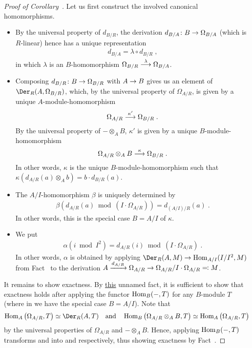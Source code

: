 \documentclass[a4paper,parskip=half,numbers=enddot, DIV=12, headheight=30pt]{scrreprt}
\begin{document}
\begin{proof}[Proof of Corollary~]
	Let us first construct the involved canonical homomorphisms.
	\begin{itemize}
		\item 
		By the universal property of $d_{B/R}$, the derivation $d_{B/A}\colon B\morphism \Omega_{B/A}$ (which is $R$-linear) hence has a unique representation 
		\begin{align*}
			d_{B/A} = \lambda \circ d_{B/R}\;,
		\end{align*}
		in which $\lambda$ is an $B$-homomorphism $\Omega_{B/R}\morphism[\lambda]\Omega_{B/A}$.
		 \item 
		 Composing $d_{B/R}\colon B \morphism \Omega_{B/R}$ with $A\morphism B$ gives us an element of $\Der_R(A, \Omega_{B/R})$, which, by the universal property of $\Omega_{A/R}$, is given by a unique $A$-module-homomorphism 
		 \begin{align*}
		 	\Omega_{A/R} \morphism[\kappa'] \Omega_{B/R}\;.
		 \end{align*}
		 By the universal property of $-\otimes_A B$, $\kappa'$ is given by a unique $B$-module-homomorphism
		 \begin{align*}
		 	\Omega_{A/R} \otimes_A B \morphism[\kappa] \Omega_{B/R}\;.
		 \end{align*}
		 In other words, $\kappa$ is the unique $B$-module-homomorphism such that $\kappa(d_{A/R}(a)\otimes_A b) = b\cdot d_{B/R}(a)$.
		 \item 
		 The $A/I$-homomorphism $\beta$ is uniquely determined by 
		 \begin{align*}
		 	\beta\left(d_{A/R}(a) \bmod (I\cdot \Omega_{A/R})\right) = d_{(A/I)/R}(a)\;.
		 \end{align*}
		 In other words, this is the special case $B=A/I$ of $\kappa$.
		 \item 
		 We put 
		 \begin{align*}
		 	\alpha(i\bmod I^2) = d_{A/R}(i) \bmod (I\cdot \Omega_{A/R})\;.
		 \end{align*}
		 In other words, $\alpha$ is obtained by applying $\Der_R(A,M) \morphism \Hom_{A/I} (I/I^2, M)$ from Fact~ to the derivation $A\xrightarrow{\smash{d}_{A/R}} \Omega_{A/R} \morphism \Omega_{A/R}/I \cdot \Omega_{A/R} \eqqcolon M$.
	\end{itemize}
	It remains to show exactness. By \hyperref[fact:HomRightExact]{this} unnamed fact, it is sufficient to show that exactness holds after applying the functor $\operatorname{Hom}_B(-,T)$ for any $B$-module $T$ (where in  we have the special case $B=A/I$). Note that 
	\begin{align*}
		\Hom_A\left(\Omega_{A/R},T\right)\simeq\Der_R(A,T)\quad\text{and}\quad \Hom_B\left(\Omega_{A/R}\otimes_AB,T\right)\simeq \Hom_A\left(\Omega_{A/R},T\right) 
	\end{align*}
	by the universal properties of $\Omega_{A/R}$ and $-\otimes_AB$. Hence, applying $\operatorname{Hom}_B(-,T)$ transforms  and  into  and  respectively, thus showing exactness by Fact~. 
\end{proof}
\end{document}
